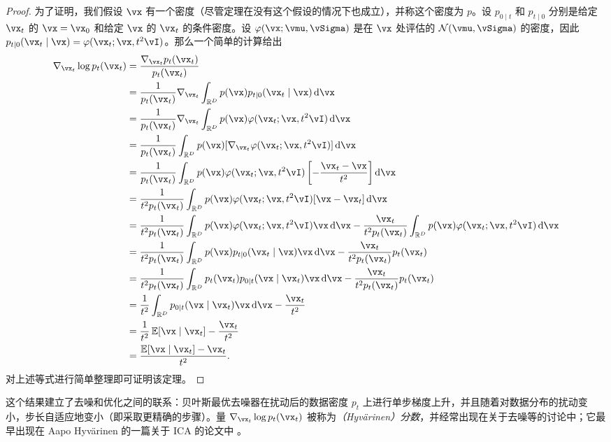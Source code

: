 \documentclass[../../book-main.tex]{subfiles}
\begin{document}
\begin{proof}
	为了证明，我们假设 \(\vx\) 有一个密度（尽管定理在没有这个假设的情况下也成立），并称这个密度为 \(p\)。设 \(p_{0 \mid t}\) 和 \(p_{t \mid 0}\) 分别是给定 \(\vx_{t}\) 的 \(\vx = \vx_{0}\) 和给定 \(\vx\) 的 \(\vx_{t}\) 的条件密度。设 \(\phi(\vx ; \vmu, \vSigma)\) 是在 \(\vx\) 处评估的 \(\dNorm(\vmu, \vSigma)\) 的密度，因此 \(p_{t \mid 0}(\vx_{t} \mid \vx) = \phi(\vx_{t} ; \vx, t^{2}\vI)\)。那么一个简单的计算给出
	\begin{align}
		\nabla_{\vx_{t}} \log p_{t}(\vx_{t})
		&= \frac{\nabla_{\vx_{t}}p_{t}(\vx_{t})}{p_{t}(\vx_{t})} \\
		&= \frac{1}{p_{t}(\vx_{t})}\nabla_{\vx_{t}}\int_{\R^{D}}p(\vx)p_{t \mid 0}(\vx_{t} \mid \vx)\odif{\vx} \\
		&=
		\frac{1}{p_{t}(\vx_{t})}\nabla_{\vx_{t}}\int_{\R^{D}}p(\vx)\phi(\vx_{t}
		;\vx, t^{2}\vI)\odif{\vx} \\
		&=
		\frac{1}{p_{t}(\vx_{t})}\int_{\R^{D}}p(\vx)[\nabla_{\vx_{t}}\phi(\vx_{t}
		;\vx, t^{2}\vI)]\odif{\vx} \\
		&= \frac{1}{p_{t}(\vx_{t})}\int_{\R^{D}}p(\vx)\phi(\vx_{t} ; \vx, t^{2}\vI)\bs{-\frac{\vx_{t} - \vx}{t^{2}}}\odif{\vx} \\
		&= \frac{1}{t^{2}p_{t}(\vx_{t})}\int_{\R^{D}}p(\vx)\phi(\vx_{t} ; \vx, t^{2}\vI)[\vx - \vx_{t}]\odif{\vx} \\
		&= \frac{1}{t^{2}p_{t}(\vx_{t})}\int_{\R^{D}}p(\vx)\phi(\vx_{t} ; \vx,
		t^{2}\vI)\vx \odif{\vx}
		- \frac{\vx_{t}}{t^{2}p_{t}(\vx_{t})}\int_{\R^{D}}p(\vx)\phi(\vx_{t} ; \vx, t^{2}\vI)\odif{\vx} \\
		&= \frac{1}{t^{2}p_{t}(\vx_{t})}\int_{\R^{D}}p(\vx)p_{t \mid 0}(\vx_{t} \mid \vx)\vx \odif{\vx} - \frac{\vx_{t}}{t^{2}p_{t}(\vx_{t})}p_{t}(\vx_{t}) \\
		&= \frac{1}{t^{2}p_{t}(\vx_{t})}\int_{\R^{D}}p_{t}(\vx_{t})p_{0 \mid t}(\vx \mid \vx_{t})\vx \odif{\vx} - \frac{\vx_{t}}{t^{2}p_{t}(\vx_{t})}p_{t}(\vx_{t}) \\
		&= \frac{1}{t^{2}}\int_{\R^{D}}p_{0 \mid t}(\vx \mid \vx_{t})\vx \odif{\vx} - \frac{\vx_{t}}{t^{2}} \\
		&= \frac{1}{t^{2}}\Ex[\vx \mid \vx_{t}] - \frac{\vx_{t}}{t^{2}} \\
		&= \frac{\Ex[\vx \mid \vx_{t}] - \vx_{t}}{t^{2}}.
	\end{align}
	对上述等式进行简单整理即可证明该定理。
\end{proof}
这个结果建立了去噪和优化之间的联系：贝叶斯最优去噪器在扰动后的数据密度 \(p_{t}\) 上进行单步梯度上升，并且随着对数据分布的扰动变小，步长自适应地变小（即采取更精确的步骤）。量 \(\nabla_{\vx_{t}}\log p_{t}(\vx_{t})\) 被称为\textit{（Hyv\"arinen）分数}，并经常出现在关于去噪等的讨论中；它最早出现在 Aapo Hyv\"arinen 的一篇关于 ICA 的论文中 \cite{hyvarinen05a}。
\end{document}
